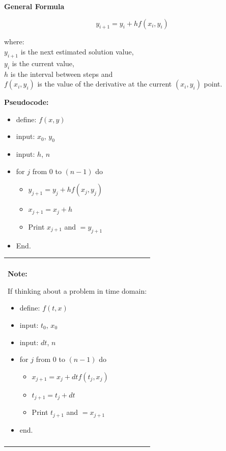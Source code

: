 \documentclass[10pt,b5paper,titlepage]{book}
\newenvironment{bbox}[1][0.96]
{
    \begin{center}
        \begin{tabular}{|p{#1\textwidth}|}
            \hline\\
}
{
            \\\\\hline
        \end{tabular}
    \end{center}
}
\begin{document}
\textbf{General Formula}

\begin{equation}
    y_{i+1} = y_i + h f(x_i,y_i)
\end{equation}

where:\\
$ y_{i+1} $ is the next estimated solution value,\\
$ y_i $ is the current value,\\
$ h $ is the interval between steps and\\
$ f(x_i,y_i) $ is the value of the derivative at the current $ (x_i,y_i) $ point.

\textbf{Pseudocode:}

\begin{itemize}
    \item define: $ f(x,y) $

    \item input: $ x_0 $, $ y_0 $

    \item input: $ h $, $ n $

    \item for $ j $ from $ 0 $ to $ (n-1) $ do
        \begin{itemize}
            \item $ y_{j+1} = y_j + hf(x_j, y_j) $
            \item $ x_{j+1} = x_j + h $
            \item Print $ x_{j+1} $ and $= y_{j+1} $
        \end{itemize}
    \item End.
\end{itemize}


\begin{bbox}[0.96]
\textbf{Note:}

If thinking about a problem in time domain:

\begin{itemize}
    \item define: $ f(t,x) $

    \item input: $ t_0 $, $ x_0 $

    \item input: $ dt $, $ n $

    \item for $ j $ from $ 0 $ to $ (n-1) $ do
        \begin{itemize}
            \item $ x_{j+1} = x_j + dt f(t_j, x_j) $
            \item $ t_{j+1} = t_j + dt $
            \item Print $ t_{j+1} $ and $= x_{j+1} $
        \end{itemize}
    \item end.
\end{itemize}

\end{bbox}
\end{document}
